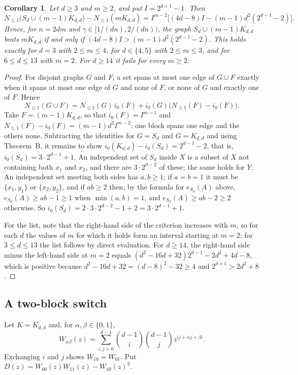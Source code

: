 \documentclass[11pt]{article}
\newtheorem{corollary}[theorem]{Corollary}
\theoremstyle{remark}
\newcommand{\Nle}[1]{N_{\le #1}}
\begin{document}
\begin{corollary}\label{cor:copies}
Let $d\ge3$ and $m\ge2$, and put $I=2^{d+1}-1$. Then
\[
 \Nle1\bigl(S_d\cup(m-1)K_{d,d}\bigr)-\Nle1(mK_{d,d})
 =I^{m-2}\bigl[(4d-8)I-(m-1)d^2(2^{d-1}-2)\bigr].
\]
Hence, for $n=2dm$ and $\gamma\in[1/(dn),2/(dn))$, the graph
$S_d\cup(m-1)K_{d,d}$ beats $mK_{d,d}$ if and only if
$(4d-8)I>(m-1)d^2(2^{d-1}-2)$. This holds exactly for $d=3$ with
$2\le m\le4$, for $d\in\{4,5\}$ with $2\le m\le3$, and for $6\le d\le13$ with
$m=2$. For $d\ge14$ it fails for every $m\ge2$.
\end{corollary}
\begin{proof}
For disjoint graphs $G$ and $F$, a set spans at most one edge of $G\cup F$
exactly when it spans at most one edge of $G$ and none of $F$, or none of $G$
and exactly one of $F$. Hence
\[
 \Nle1(G\cup F)=\Nle1(G)\,i_0(F)+i_0(G)\bigl(\Nle1(F)-i_0(F)\bigr).
\]
Take $F=(m-1)K_{d,d}$, so that $i_0(F)=I^{m-1}$ and
$\Nle1(F)-i_0(F)=(m-1)d^2I^{m-2}$: one block spans one edge and the others
none. Subtracting the identities for $G=S_d$ and $G=K_{d,d}$ and using
Theorem~B, it remains to show $i_0(K_{d,d})-i_0(S_d)=2^{d-1}-2$, that is,
$i_0(S_d)=3\cdot2^{d-1}+1$. An independent set of $S_d$ inside $X$ is a subset
of $X$ not containing both $x_1$ and $x_2$, and there are $3\cdot2^{d-2}$ of
these; the same holds for $Y$. An independent set meeting both sides has
$a,b\ge1$; if $a=b=1$ it must be $\{x_1,y_1\}$ or $\{x_2,y_2\}$, and if
$ab\ge2$ then, by the formula for $e_{S_d}(A)$ above, $e_{S_d}(A)\ge ab-1\ge1$
when $\min(a,b)=1$, and $e_{S_d}(A)\ge ab-2\ge2$ otherwise. So
$i_0(S_d)=2\cdot3\cdot2^{d-2}-1+2=3\cdot2^{d-1}+1$.

For the list, note that the right-hand side of the criterion increases with
$m$, so for each $d$ the values of $m$ for which it holds form an interval
starting at $m=2$; for $3\le d\le13$ the list follows by direct evaluation.
For $d\ge14$, the right-hand side minus the left-hand side at $m=2$ equals
$(d^2-16d+32)2^{d-1}-2d^2+4d-8$, which is positive because
$d^2-16d+32=(d-8)^2-32\ge4$ and $2^{d+1}>2d^2+8$.
\end{proof}

\subsection{A two-block switch}
Let $K=K_{d,d}$ and, for $\alpha,\beta\in\{0,1\}$,
\[
 W_{\alpha\beta}(z)=\sum_{i,j=0}^{d-1}\binom{d-1}i\binom{d-1}j
 z^{ij+\alpha j+\beta i}.
\]
Exchanging $i$ and $j$ shows $W_{10}=W_{01}$. Put
$D(z)=W_{00}(z)W_{11}(z)-W_{10}(z)^2$.
\end{document}
